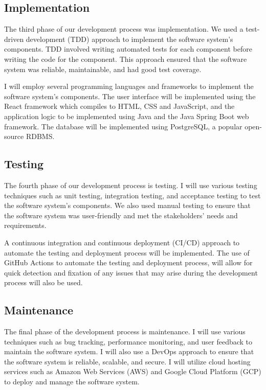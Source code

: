 \documentclass{article}
\begin{document}
\subsection{Implementation}

The third phase of our development process was implementation. We used a test-driven development (TDD) approach to implement the software system's components. TDD involved writing automated tests for each component before writing the code for the component. This approach ensured that the software system was reliable, maintainable, and had good test coverage.

I will employ several programming languages and frameworks to implement the software system's components. The user interface will be implemented using the React framework which compiles to HTML, CSS and JavaScript, and the application logic to be implemented using Java and the Java Spring Boot web framework. The database will be implemented using PostgreSQL, a popular open-source RDBMS.

\subsection{Testing}

The fourth phase of our development process is testing. I will use various testing techniques such as unit testing, integration testing, and acceptance testing to test the software system's components. We also used manual testing to ensure that the software system was user-friendly and met the stakeholders' needs and requirements.

A continuous integration and continuous deployment (CI/CD) approach to automate the testing and deployment process  will be implemented. The use of GitHub Actions to automate the testing and deployment process, will allow for quick detection and fixation of any issues that may arise during the development process will also be used.

\subsection{Maintenance}

The final phase of the development process is maintenance. I will use various techniques such as bug tracking, performance monitoring, and user feedback to maintain the software system. I will also use a DevOps approach to ensure that the software system is reliable, scalable, and secure. I will utilize cloud hosting services such as Amazon Web Services (AWS) and Google Cloud Platform (GCP) to deploy and manage the software system.
\end{document}
